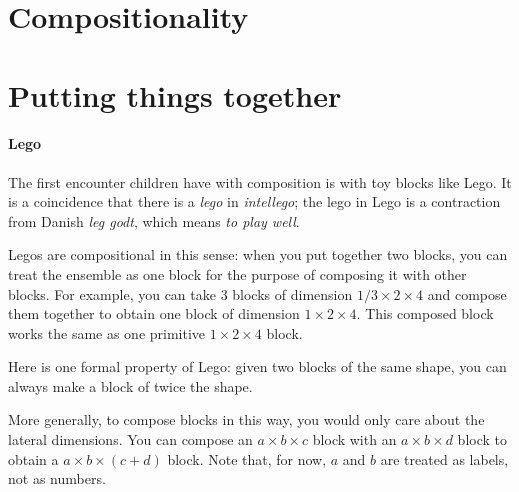 

\section{Compositionality}


\section{Putting things together}

\paragraph{Lego}

The first encounter children have with composition is with toy blocks like Lego. It is a coincidence that there is a \emph{lego} in \emph{intellego}; the lego in Lego is a contraction from Danish \emph{leg godt}, which means \emph{to play well}.

Legos are compositional in this sense: when you put together two blocks, you can treat the ensemble as one block for the purpose of composing it with other blocks. For example, you can take 3 blocks of dimension $1/3 \times 2 \times 4$ and compose them together to obtain one block of dimension $1 \times 2 \times 4$. This composed block works the same as one primitive  $1 \times 2 \times 4 $ block.

\hfill
{}
\hfill
{}
\hfill



Here is one formal property of Lego: given two blocks of the same shape, you can always make a block of twice the shape.

More generally, to compose blocks in this way, you would only care about the lateral dimensions.
You can compose an $a \times b \times c$ block with an  $a \times b \times d$ block to obtain a  $a \times b \times( c + d)$ block.
Note that, for now, $a$ and $b$ are treated as labels, not as numbers.

